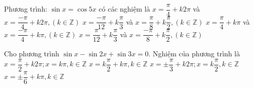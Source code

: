 \begin{ex}%
	Phương  trình: $\sin x =\cos 5x$ có các nghiệm là
	 \choice
		{$x=\dfrac{\pi}{4}+k2\pi$ và $x=\dfrac{-\pi}{4}+k2\pi  , (k \in \mathbb{Z})$}
		{$x=\dfrac{-\pi}{12}+k\dfrac{\pi}{3}$ và  $x=\dfrac{\pi}{8}+k\dfrac{\pi}{2} , (k \in \mathbb{Z})$}
		{$x=\dfrac{\pi}{4}+k\pi$  và $x=\dfrac{-\pi}{4}+k\pi , (k \in \mathbb{Z})$}
		 {\True $x=\dfrac{\pi}{12}+k\dfrac{\pi}{3}$ và $x=\dfrac{-\pi}{8}+k\dfrac{\pi}{2} , (k \in \mathbb{Z})$}
\end{ex}

\begin{ex}%
	Cho phương trình $\sin{x}-\sin{2x}+\sin{3x}=0$. Nghiệm  của phương trình là
	\choice 
		{$x=\dfrac{\pi}{2}+k2\pi; x=k\pi, k\in \mathbb{Z}$} 
		 {$x=k\dfrac{\pi}{2}+k\pi, k\in \mathbb{Z}$}
		{\True $x=\pm \dfrac{\pi}{3}+k2\pi;  x=k\dfrac{\pi}{2}, k\in \mathbb{Z}$}
		{$x=\pm  \dfrac{\pi}{6}+k\pi, k\in \mathbb{Z}$}
\end{ex}

